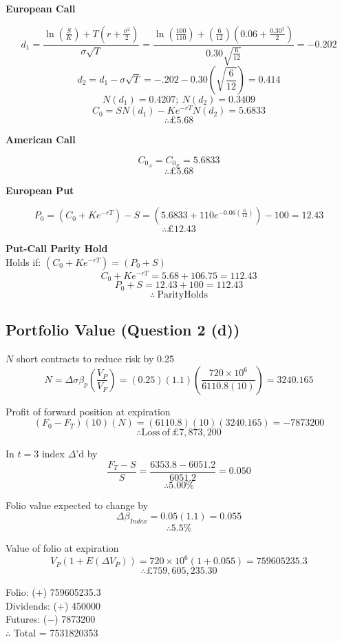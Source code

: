 \documentclass[11pt, english]{article}
\begin{document}
	\textbf{European Call}

	$$d_1=\frac{\ln\left(\frac{S}{K}\right)+T\left(r+\frac{\sigma^2}{2}\right)}{\sigma\sqrt{T}}=\frac{\ln\left(\frac{100}{110}\right)+\left(\frac{6}{12}\right)\left(0.06+\frac{0.30^2}{2}\right)}{0.30\sqrt{\frac{6}{12}}}=-0.202$$
	$$d_2=d_1-\sigma\sqrt{T}=-.202-0.30\left(\sqrt{\frac{6}{12}}\right)=0.414$$
	$$N(d_1)=0.4207;\ N(d_2)=0.3409$$
	$$C_0=SN(d_1)-Ke^{-rT}N(d_2)=5.6833$$
	$$\therefore\pounds5.68$$

	\textbf{American Call}

	$$C_{0_A}=C_{0_E}=5.6833$$
	$$\therefore\pounds5.68$$

	\textbf{European Put}

	$$P_0=(C_0+Ke^{-rT})-S=\left(5.6833+110e^{-0.06\left(\frac{6}{12}\right)}\right)-100=12.43$$
	$$\therefore\pounds12.43$$
	
	\textbf{Put-Call Parity Hold}\\

	Holds if: $(C_0+Ke^{-rT})=(P_0+S)$
	$$C_0+Ke^{-rT}=5.68+106.75=112.43$$
	$$P_0+S=12.43+100=112.43$$
	$$\therefore\ \mathrm{Parity Holds}$$

	\newpage

	\subsection{Portfolio Value (Question 2 (d))}

	$N$ short contracts to reduce risk by 0.25
	$$N=\Delta\sigma\beta_p\left(\frac{V_P}{V_F}\right)=(0.25)(1.1)\left(\frac{720\times10^6}{6110.8(10)}\right)=3240.165$$

	Profit of forward position at expiration
	$$(F_0-F_T)(10)(N)=(6110.8)(10)(3240.165)=-7873200$$
	$$\therefore\mathrm{Loss\ of\ }\pounds7,873,200$$

	In $t=3$ index $\Delta$'d by
	$$\frac{F_T-S}{S}=\frac{6353.8-6051.2}{6051.2}=0.050$$
	$$\therefore5.00\%$$

	Folio value expected to change by
	$$\Delta\beta_{Index}=0.05(1.1)=0.055$$
	$$\therefore5.5\%$$

	Value of folio at expiration
	$$V_P(1+E(\Delta V_P))=720\times10^6(1+0.055)=759605235.3$$
	$$\therefore\pounds759,605,235.30$$

	Folio: ($+$) 759605235.3\\
	Dividends: ($+$) 450000\\
	Futures: ($-$) 7873200\\
	$\therefore$ Total = 7531820353\\
\end{document}
